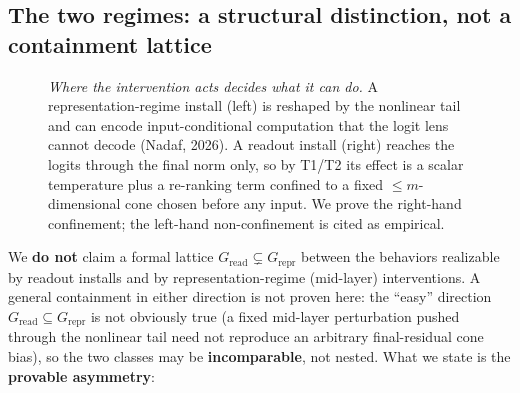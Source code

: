 \documentclass[11pt]{article}
\theoremstyle{plain}
\theoremstyle{definition}
\begin{document}
\subsection{The two regimes: a structural distinction, not a containment lattice}

\begin{figure}[ht]\centering
{}
\caption{\emph{Where the intervention acts decides what it can do.} A representation-regime install (left) is reshaped by the nonlinear tail and can encode input-conditional computation that the logit lens cannot decode (Nadaf, 2026). A readout install (right) reaches the logits through the final norm only, so by T1/T2 its effect is a scalar temperature plus a re-ranking term confined to a fixed $\le m$-dimensional cone chosen before any input. We prove the right-hand confinement; the left-hand non-confinement is cited as empirical.}
\label{fig:regimes}
\end{figure}

We \textbf{do not} claim a formal lattice $G_{\mathrm{read}} \subsetneq G_{\mathrm{repr}}$ between the behaviors realizable by readout installs and by representation-regime (mid-layer) interventions. A general containment in either direction is not proven here: the ``easy'' direction $G_{\mathrm{read}} \subseteq G_{\mathrm{repr}}$ is not obviously true (a fixed mid-layer perturbation pushed through the nonlinear tail need not reproduce an arbitrary final-residual cone bias), so the two classes may be \textbf{incomparable}, not nested. What we state is the \textbf{provable asymmetry}:
\end{document}
